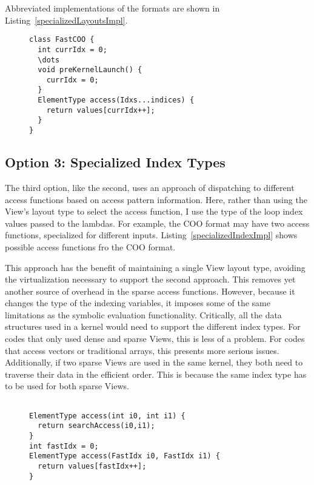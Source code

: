 Abbreviated implementations of the formats are shown in Listing~\ref{specializedLayoutsImpl}.
\begin{figure}
\begin{lstlisting}[caption={Abbreviated format implementation for the Specialized Traversal Layout approach.},label=specializedLayoutsImpl]
class FastCOO {
  int currIdx = 0;
  \dots
  void preKernelLaunch() {
    currIdx = 0;
  }
  ElementType access(Idxs...indices) {
    return values[currIdx++];
  }
}
\end{lstlisting}
\end{figure}

\subsection{Option 3: Specialized Index Types}
The third option, like the second, uses an approach of dispatching to different access functions based on access pattern information.
Here, rather than using the View's layout type to select the access function, I use the type of the loop index values passed to the lambdas.
For example, the COO format may have two access functions, specialized for different inputs.
Listing~\ref{specializedIndexImpl} shows possible access functions fro the COO format.

This approach has the benefit of maintaining a single View layout type, avoiding the virtualization necessary to support the second approach.
This removes yet another source of overhead in the sparse access functions.
However, because it changes the type of the indexing variables, it imposes some of the same limitations as the symbolic evaluation functionality. 
Critically, all the data structures used in a kernel would need to support the different index types. 
For codes that only used dense and sparse Views, this is less of a problem.
For codes that access vectors or traditional arrays, this presents more serious issues.
Additionally, if two sparse Views are used in the same kernel, they both need to traverse their data in the efficient order.
This is because the same index type has to be used for both sparse Views.


\begin{figure}
\begin{lstlisting}[caption={Reference implementation for the Specialized Index Types approach.}, label=specializedIndexImpl]

ElementType access(int i0, int i1) {
  return searchAccess(i0,i1);
}
int fastIdx = 0;
ElementType access(FastIdx i0, FastIdx i1) {
  return values[fastIdx++];
}
\end{lstlisting}
\end{figure}

